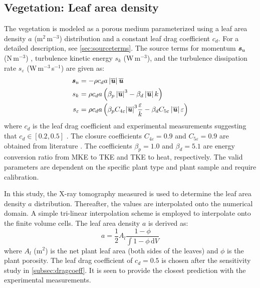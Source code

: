 \subsection{Vegetation: Leaf area density}

The vegetation is modeled as a porous medium parameterized using a leaf area density $a$ (m$^2$\,m$^{-3}$) distribution and a constant leaf drag coefficient $c_d$. For a detailed description, see \cref{sec:sourceterms}. The source terms for momentum $\textbf{\textit{s}}_u$ (N\,m$^{-3}$) , turbulence kinetic energy $s_k$ (W\,m$^{-3}$), and the turbulence dissipation rate $s_{\varepsilon}$ (W\,m$^{-3}$\,s$^{-1}$) are given as:
	\begin{align}
		\textbf{\textit{s}}_u &=  - \rho {c_d}a\left| \overline{\textbf{\textit{u}}} \right|\overline{\textbf{\textit{u}}} 	\label{eq:source_veg1}	 \\
		s_k &= \rho {c_d}a\left( \beta _p \left| \overline{\textbf{\textit{u}}} \right|^3 - \beta _d\left| \overline{\textbf{\textit{u}}} \right|k \right) \label{eq:source_veg2} \\
		s_\varepsilon &= \rho {c_d}a\left( {{\beta _p}{C_{4\varepsilon }}{{\left| \overline{\textbf{\textit{u}}} \right|}^3}\frac{\varepsilon }{k} - {\beta _d}{C_{5\varepsilon }}\left| \overline{\textbf{\textit{u}}} \right|\varepsilon } \right)
		\label{eq:source_veg3}
	\end{align}
where $c_d$ is the leaf drag coefficient \citep{Wilson1977} and experimental measurements suggesting that $c_d \in \left[0.2, 0.5\right]$ \citep{Vogel1989}. The closure coefficients $C_{4\varepsilon}=0.9$ and $C_{5\varepsilon}=0.9$ are obtained from literature \citep{Katul2004, Kenjeres2013, Sanz2003}. The coefficients $\beta_p=1.0$ and $\beta_d=5.1$ are energy conversion ratio from MKE to TKE and TKE to heat, respectively. The valid parameters are dependent on the specific plant type and plant sample and require calibration. 

In this study, the X-ray tomography measured is used to determine the leaf area density $a$ distribution. Thereafter, the values are interpolated onto the numerical domain. A simple tri-linear interpolation scheme is employed to interpolate onto the finite volume cells. The leaf area density $a$ is derived as: 
	\begin{equation}
	a = \frac{1}{2} A_l \frac{1 - \phi}{\int {1 - \phi }\,\mathrm{d}V}
	\label{eq:leafdensitywteq}
	\end{equation}
where $A_l$ (m$^{2}$) is the net plant leaf area (both sides of the leaves) and $\phi$ is the plant porosity. The leaf drag coefficient of $c_d = 0.5$ is chosen after the sensitivity study in \cref{subsec:dragcoeff}. It is seen to provide the closest prediction with the experimental measurements.

